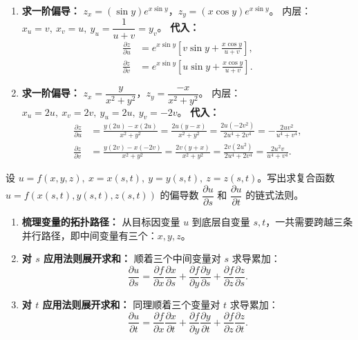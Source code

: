 \documentclass[lang=cn,11pt]{elegantbook}
\begin{document}
\begin{solution}
\begin{enumerate}
  \item[(5)] \textbf{求一阶偏导：} $z_x = (\sin y)e^{x\sin y}$，$z_y = (x\cos y)e^{x\sin y}$。
  内层：$x_u = v,\ x_v = u,\ y_u = \dfrac{1}{u+v} = y_v$。
  \textbf{代入：}
  \begin{align*}
  \frac{\partial z}{\partial u} &= e^{x\sin y}\left[ v\sin y + \frac{x\cos y}{u+v} \right], \\
  \frac{\partial z}{\partial v} &= e^{x\sin y}\left[ u\sin y + \frac{x\cos y}{u+v} \right].
  \end{align*}

  \item[(6)] \textbf{求一阶偏导：} $z_x = \dfrac{y}{x^2+y^2}$，$z_y = \dfrac{-x}{x^2+y^2}$。
  内层：$x_u = 2u,\ x_v = 2v,\ y_u = 2u,\ y_v = -2v$。
  \textbf{代入：}
  \begin{align*}
  \frac{\partial z}{\partial u} &= \frac{y(2u) - x(2u)}{x^2+y^2} = \frac{2u(y-x)}{x^2+y^2} = \frac{2u(-2v^2)}{2u^4+2v^4} = -\frac{2uv^2}{u^4+v^4}, \\
  \frac{\partial z}{\partial v} &= \frac{y(2v) - x(-2v)}{x^2+y^2} = \frac{2v(y+x)}{x^2+y^2} = \frac{2v(2u^2)}{2u^4+2v^4} = \frac{2u^2v}{u^4+v^4}.
  \end{align*}
\end{enumerate}
\end{solution}

\begin{exercise}[抽象函数链式法则推导]
设 $u = f(x,y,z),\ x = x(s,t),\ y = y(s,t),\ z = z(s,t)$。写出求复合函数 $u = f(x(s,t),y(s,t),z(s,t))$ 的偏导数 $\dfrac{\partial u}{\partial s}$ 和 $\dfrac{\partial u}{\partial t}$ 的链式法则。
\end{exercise}

\begin{solution}
\begin{enumerate}
  \item \textbf{梳理变量的拓扑路径：}
  从目标因变量 $u$ 到底层自变量 $s, t$，一共需要跨越三条并行路径，即中间变量有三个：$x, y, z$。
  
  \item \textbf{对 $s$ 应用法则展开求和：}
  顺着三个中间变量对 $s$ 求导累加：
  \[
  \frac{\partial u}{\partial s} = \frac{\partial f}{\partial x}\frac{\partial x}{\partial s} + \frac{\partial f}{\partial y}\frac{\partial y}{\partial s} + \frac{\partial f}{\partial z}\frac{\partial z}{\partial s}.
  \]
  
  \item \textbf{对 $t$ 应用法则展开求和：}
  同理顺着三个变量对 $t$ 求导累加：
  \[
  \frac{\partial u}{\partial t} = \frac{\partial f}{\partial x}\frac{\partial x}{\partial t} + \frac{\partial f}{\partial y}\frac{\partial y}{\partial t} + \frac{\partial f}{\partial z}\frac{\partial z}{\partial t}.
  \]
\end{enumerate}
\end{solution}
\end{document}

